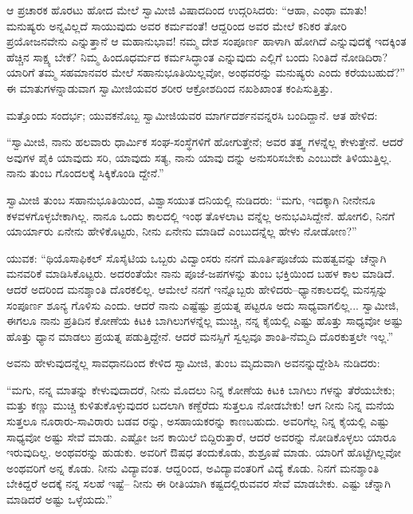 ಆ ಪ್ರಚಾರಕ ಹೊರಟು ಹೋದ ಮೇಲೆ ಸ್ವಾಮೀಜಿ ವಿಷಾದದಿಂದ ಉದ್ಗರಿಸಿದರು: “ಆಹಾ, ಎಂಥಾ ಮಾತು! ಮನುಷ್ಯರು ಅನ್ನವಿಲ್ಲದೆ ಸಾಯುವುದು ಅವರ ಕರ್ಮವಂತೆ! ಆದ್ದರಿಂದ ಅವರ ಮೇಲೆ ಕನಿಕರ ತೋರಿ ಪ್ರಯೋಜನವೇನು ಎನ್ನುತ್ತಾನೆ ಆ ಮಹಾನುಭಾವ! ನಮ್ಮ ದೇಶ ಸಂಪೂರ್ಣ ಹಾಳಾಗಿ ಹೋಗಿದೆ ಎನ್ನುವುದಕ್ಕೆ ಇದಕ್ಕಿಂತ ಹೆಚ್ಚಿನ ಸಾಕ್ಷ್ಯ ಬೇಕೆ? ನಿಮ್ಮ ಹಿಂದೂಧರ್ಮದ ಕರ್ಮಸಿದ್ಧಾಂತ ಎನ್ನುವುದು ಎಲ್ಲಿಗೆ ಬಂದು ನಿಂತಿದೆ ನೋಡಿದಿರಾ? ಯಾರಿಗೆ ತಮ್ಮ ಸಹಮಾನವರ ಮೇಲೆ ಸಹಾನುಭೂತಿಯಿಲ್ಲವೋ, ಅಂಥವರನ್ನು ಮನುಷ್ಯರು ಎಂದು ಕರೆಯಬಹುದೆ?” ಈ ಮಾತುಗಳನ್ನಾಡುವಾಗ ಸ್ವಾಮೀಜಿಯವರ ಶರೀರ ಆಕ್ರೋಶದಿಂದ ನಖಶಿಖಾಂತ ಕಂಪಿಸುತ್ತಿತ್ತು.

ಮತ್ತೊಂದು ಸಂದರ್ಭ; ಯುವಕನೊಬ್ಬ ಸ್ವಾಮೀಜಿಯವರ ಮಾರ್ಗದರ್ಶನವನ್ನರಸಿ ಬಂದಿದ್ದಾನೆ. ಆತ ಹೇಳಿದ:

“ಸ್ವಾಮೀಜಿ, ನಾನು ಹಲವಾರು ಧಾರ್ಮಿಕ ಸಂಘ-ಸಂಸ್ಥೆಗಳಿಗೆ ಹೋಗುತ್ತೇನೆ; ಅವರ ತತ್ತ್ವ ಗಳನ್ನೆಲ್ಲ ಕೇಳುತ್ತೇನೆ. ಆದರೆ ಅವುಗಳ ಪೈಕಿ ಯಾವುದು ಸರಿ, ಯಾವುದು ಸತ್ಯ, ನಾನು ಯಾವು ದನ್ನು ಅನುಸರಿಸಬೇಕು ಎಂಬುದೇ ತಿಳಿಯುತ್ತಿಲ್ಲ. ನಾನು ತುಂಬ ಗೊಂದಲಕ್ಕೆ ಸಿಕ್ಕಿಕೊಂಡಿ ದ್ದೇನೆ.”

ಸ್ವಾಮೀಜಿ ತುಂಬ ಸಹಾನುಭೂತಿಯಿಂದ, ವಿಶ್ವಾಸಯುತ ದನಿಯಲ್ಲಿ ನುಡಿದರು: “ಮಗು, ಇದಕ್ಕಾಗಿ ನೀನೇನೂ ಕಳವಳಗೊಳ್ಳಬೇಕಾಗಿಲ್ಲ. ನಾನೂ ಒಂದು ಕಾಲದಲ್ಲಿ ಇಂಥ ತೊಳಲಾಟ ವನ್ನೆಲ್ಲ ಅನುಭವಿಸಿದ್ದೇನೆ. ಹೋಗಲಿ, ನಿನಗೆ ಯಾರ್ಯಾರು ಏನೇನು ಹೇಳಿಕೊಟ್ಟರು, ನೀನು ಏನೇನು ಮಾಡಿದೆ ಎಂಬುದನ್ನೆಲ್ಲ ಹೇಳು ನೋಡೋಣ?”

ಯುವಕ: “ಥಿಯೊಸಾಫಿಕಲ್ ಸೊಸೈಟಿಯ ಒಬ್ಬರು ವಿದ್ವಾಂಸರು ನನಗೆ ಮೂರ್ತಿಪೂಜೆಯ ಮಹತ್ವವನ್ನು ಚೆನ್ನಾಗಿ ಮನವರಿಕೆ ಮಾಡಿಸಿಕೊಟ್ಟರು. ಅದರಂತೆಯೇ ನಾನು ಪೂಜೆ-ಜಪಗಳನ್ನು ತುಂಬ ಭಕ್ತಿಯಿಂದ ಬಹಳ ಕಾಲ ಮಾಡಿದೆ. ಆದರೆ ಅದರಿಂದ ಮನಶ್ಶಾಂತಿ ದೊರಕಲಿಲ್ಲ. ಆಮೇಲೆ ನನಗೆ ಇನ್ನೊಬ್ಬರು ಹೇಳಿದರು–ಧ್ಯಾನಕಾಲದಲ್ಲಿ ಮನಸ್ಸನ್ನು ಸಂಪೂರ್ಣ ಶೂನ್ಯ ಗೊಳಿಸು ಎಂದು. ಆದರೆ ನಾನು ಎಷ್ಟೆಷ್ಟು ಪ್ರಯತ್ನ ಪಟ್ಟರೂ ಅದು ಸಾಧ್ಯವಾಗಲಿಲ್ಲ... ಸ್ವಾಮೀಜಿ, ಈಗಲೂ ನಾನು ಪ್ರತಿದಿನ ಕೋಣೆಯ ಕಿಟಕಿ ಬಾಗಿಲುಗಳನ್ನೆಲ್ಲ ಮುಚ್ಚಿ, ನನ್ನ ಕೈಯಲ್ಲಿ ಎಷ್ಟು ಹೊತ್ತು ಸಾಧ್ಯವೋ ಅಷ್ಟು ಹೊತ್ತು ಧ್ಯಾನ ಮಾಡಲು ಪ್ರಯತ್ನ ಪಡುತ್ತಿದ್ದೇನೆ. ಆದರೆ ಮನಸ್ಸಿಗೆ ಸ್ವಲ್ಪವೂ ಶಾಂತಿ-ನೆಮ್ಮದಿ ದೊರಕುತ್ತಲೇ ಇಲ್ಲ.”

ಅವನು ಹೇಳುವುದನ್ನೆಲ್ಲ ಸಾವಧಾನದಿಂದ ಕೇಳಿದ ಸ್ವಾಮೀಜಿ, ತುಂಬ ಮೃದುವಾಗಿ ಅವನನ್ನುದ್ದೇಶಿಸಿ ನುಡಿದರು:

“ಮಗು, ನನ್ನ ಮಾತನ್ನು ಕೇಳುವುದಾದರೆ, ನೀನು ಮೊದಲು ನಿನ್ನ ಕೋಣೆಯ ಕಿಟಕಿ ಬಾಗಿಲು ಗಳನ್ನು ತೆರೆಯಬೇಕು; ಮತ್ತು ಕಣ್ಣು ಮುಚ್ಚಿ ಕುಳಿತುಕೊಳ್ಳುವುದರ ಬದಲಾಗಿ ಕಣ್ದೆರೆದು ಸುತ್ತಲೂ ನೋಡಬೇಕು! ಆಗ ನೀನು ನಿನ್ನ ಮನೆಯ ಸುತ್ತಲೂ ನೂರಾರು-ಸಾವಿರಾರು ಬಡವ ರನ್ನು, ಅಸಹಾಯಕರನ್ನು ಕಾಣಬಹುದು. ಅವರಿಗೆಲ್ಲ ನಿನ್ನ ಕೈಯಲ್ಲಿ ಎಷ್ಟು ಸಾಧ್ಯವೋ ಅಷ್ಟು ಸೇವೆ ಮಾಡು. ಎಷ್ಟೋ ಜನ ಕಾಯಿಲೆ ಬಿದ್ದಿರುತ್ತಾರೆ, ಆದರೆ ಅವರನ್ನು ನೋಡಿಕೊಳ್ಳಲು ಯಾರೂ ಇರುವುದಿಲ್ಲ. ಅಂಥವರನ್ನು ಹುಡುಕು. ಅವರಿಗೆ ಔಷಧ ತಂದುಕೊಡು, ಶುಶ್ರೂಷೆ ಮಾಡು. ಯಾರಿಗೆ ಹೊಟ್ಟೆಗಿಲ್ಲವೋ ಅಂಥವರಿಗೆ ಅನ್ನ ಕೊಡು. ನೀನು ವಿದ್ಯಾವಂತ. ಆದ್ದರಿಂದ, ಅವಿದ್ಯಾವಂತರಿಗೆ ವಿದ್ಯೆ ಕೊಡು. ನಿನಗೆ ಮನಶ್ಶಾಂತಿ ಬೇಕಿದ್ದರೆ ಅದಕ್ಕೆ ನನ್ನ ಸಲಹೆ ಇಷ್ಟೆ– ನೀನು ಈ ರೀತಿಯಾಗಿ ಕಷ್ಟದಲ್ಲಿರುವವರ ಸೇವೆ ಮಾಡಬೇಕು. ಎಷ್ಟು ಚೆನ್ನಾಗಿ ಮಾಡಿದರೆ ಅಷ್ಟು ಒಳ್ಳೆಯದು.”

